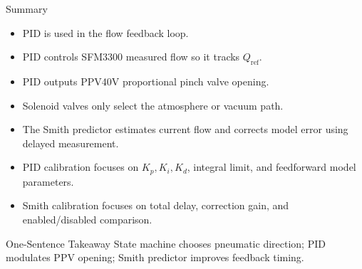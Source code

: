 \documentclass[aspectratio=169,10pt]{beamer}
\begin{document}
\begin{frame}{Summary}
  \begin{itemize}
    \item PID is used in the flow feedback loop.
    \item PID controls SFM3300 measured flow so it tracks $Q_{\mathrm{ref}}$.
    \item PID outputs PPV40V proportional pinch valve opening.
    \item Solenoid valves only select the atmosphere or vacuum path.
    \item The Smith predictor estimates current flow and corrects model error using delayed measurement.
    \item PID calibration focuses on $K_p,K_i,K_d$, integral limit, and feedforward model parameters.
    \item Smith calibration focuses on total delay, correction gain, and enabled/disabled comparison.
  \end{itemize}

  \vspace{0.6em}
  \begin{block}{One-Sentence Takeaway}
    State machine chooses pneumatic direction; PID modulates PPV opening; Smith predictor improves feedback timing.
  \end{block}
\end{frame}
\end{document}
